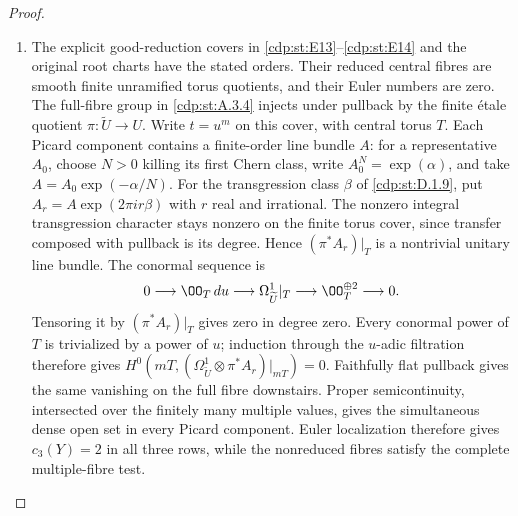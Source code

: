 \begin{proof}
\begin{enumerate}[label=\arabic*.,leftmargin=*]
\item The explicit good-reduction covers in \ref{cdp:st:E13}--\ref{cdp:st:E14}
and the original root charts have the stated orders.
Their reduced central fibres are smooth finite unramified
torus quotients, and their Euler numbers are zero.
The full-fibre group in \ref{cdp:st:A.3.4} injects under
pullback by the finite \'etale quotient $\pi:\widetilde U\to U$.
Write $t=u^m$ on this cover, with central torus $T$.
Each Picard component contains a finite-order line bundle $A$:
for a representative $A_0$, choose $N>0$ killing its first Chern class,
write $A_0^N=\exp(\alpha)$, and take $A=A_0\exp(-\alpha/N)$.
For the transgression class $\beta$ of \ref{cdp:st:D.1.9}, put
$A_r=A\exp(2\pi i r\beta)$ with $r$ real and irrational.
The nonzero integral transgression character stays nonzero on the
finite torus cover, since transfer composed with pullback is its
degree. Hence $(\pi^*A_r)|_T$ is a nontrivial unitary line bundle.
The conormal sequence is
\[
 0\longrightarrow\OO_T\,du
 \longrightarrow\Omega^1_{\widetilde U}|_T
 \longrightarrow\OO_T^{\oplus2}\longrightarrow0.
\]
Tensoring it by $(\pi^*A_r)|_T$ gives zero in degree zero.
Every conormal power of $T$ is trivialized by a power of $u$;
induction through the $u$-adic filtration therefore gives
$H^0(mT,(\Omega^1_{\widetilde U}\otimes\pi^*A_r)|_{mT})=0$.
Faithfully flat pullback gives the same vanishing on the full fibre
downstairs. Proper semicontinuity, intersected over the finitely many
multiple values, gives the simultaneous dense open set in every
Picard component. Euler localization
therefore gives $c_3(Y)=2$ in all three rows, while the
nonreduced fibres satisfy the complete multiple-fibre
test.

\end{enumerate}
\end{proof}
